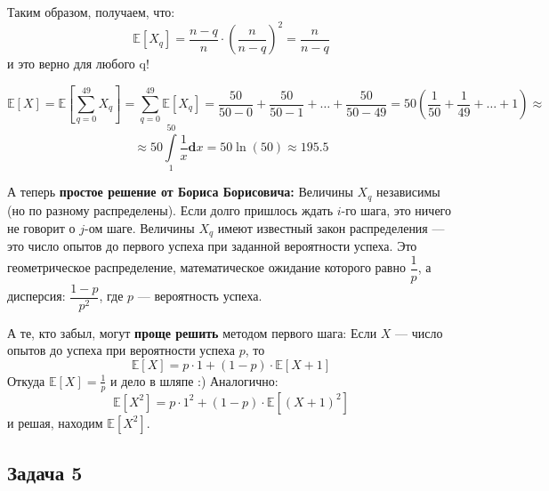 \documentclass[a4paper,12pt]{article}
\theoremstyle{plain}                         %
\theoremstyle{definition}                  %
\theoremstyle{remark}                      %
\begin{document}
Таким образом, получаем, что:
$$
\mathbb{E}[X_q] = \frac{n-q}{n}\cdot \left( \frac{n}{n-q}\right)^2 = \frac{n}{n-q}
$$
\hspace{10cm} и это верно для любого q!

$$
\mathbb{E}[X] = \mathbb{E}\left[\sum \limits_{q=0}^{49}X_q\right] = \sum \limits_{q=0}^{49}\mathbb{E}[X_q] = 
\frac{50}{50-0} + \frac{50}{50-1} + \dots + \frac{50}{50-49} = 50\left(\frac{1}{50} + \frac{1}{49} + \dots + 1\right) \approx
$$
$$
\approx 50\int\limits_{1}^{50}\frac{1}{x}\mathbf{d}x = 50\ln(50) \approx 195.5
$$

А теперь \textbf{простое решение от Бориса Борисовича:}
Величины $X_q$ независимы (но по разному распределены). Если долго пришлось ждать $i$-го шага, это ничего не говорит о $j$-ом шаге. Величины $X_q$ имеют известный закон распределения --- это число опытов до первого успеха при заданной вероятности успеха. Это геометрическое распределение, математическое ожидание которого равно $\dfrac{1}{p}$, а дисперсия: $\dfrac{1-p}{p^2}$, где $p$ --- \vspace{0.2cm}  вероятность успеха.

А те, кто забыл, могут \textbf{проще решить} методом первого шага:
Если $X$ --- число опытов до успеха при вероятности успеха $p$, то 
\[
\mathbb{E}[X]=p\cdot 1 + (1-p)\cdot \mathbb{E}[X+1]
\]
Откуда $\mathbb{E}[X]=\frac{1}{p}$ и дело в шляпе :)
Аналогично:
\[
\mathbb{E}[X^2]=p\cdot 1^2 + (1-p) \cdot \mathbb{E}[(X+1)^2]
\]
и решая, находим $\mathbb{E}[X^2]$. 



\begin{center}
\subsection*{Задача 5}
\end{center}
\end{document}
